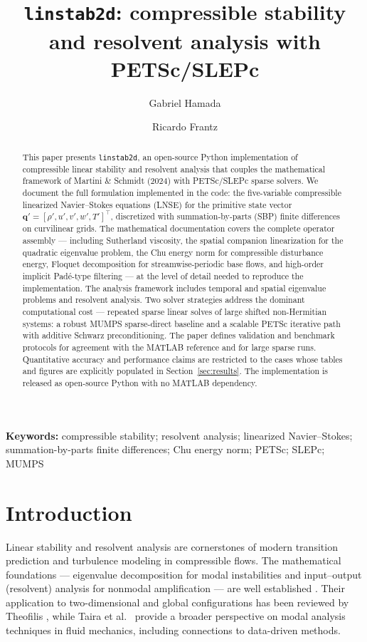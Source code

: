 \documentclass[11pt]{article}
\title{\texttt{linstab2d}: compressible stability and resolvent analysis with PETSc/SLEPc}
\author{Gabriel Hamada \and Ricardo Frantz}
\date{}
\newcommand{\bqp}{\mathbf{q}'}
\begin{document}
\maketitle

\begin{abstract}
This paper presents \texttt{linstab2d}, an open-source Python implementation of compressible linear stability and resolvent analysis that couples the mathematical framework of Martini \& Schmidt (2024) with PETSc/SLEPc sparse solvers.
We document the full formulation implemented in the code: the five-variable compressible linearized Navier--Stokes equations (LNSE) for the primitive state vector $\bqp=[\rho',u',v',w',T']^\top$, discretized with summation-by-parts (SBP) finite differences on curvilinear grids.
The mathematical documentation covers the complete operator assembly --- including Sutherland viscosity, the spatial companion linearization for the quadratic eigenvalue problem, the Chu energy norm for compressible disturbance energy, Floquet decomposition for streamwise-periodic base flows, and high-order implicit Pad\'e-type filtering --- at the level of detail needed to reproduce the implementation.
The analysis framework includes temporal and spatial eigenvalue problems and resolvent analysis.
Two solver strategies address the dominant computational cost --- repeated sparse linear solves of large shifted non-Hermitian systems: a robust MUMPS sparse-direct baseline and a scalable PETSc iterative path with additive Schwarz preconditioning.
The paper defines validation and benchmark protocols for agreement with the MATLAB reference and for large sparse runs.
Quantitative accuracy and performance claims are restricted to the cases whose tables and figures are explicitly populated in Section~\ref{sec:results}.
The implementation is released as open-source Python with no MATLAB dependency.
\end{abstract}

\noindent\textbf{Keywords:} compressible stability; resolvent analysis; linearized Navier--Stokes; summation-by-parts finite differences; Chu energy norm; PETSc; SLEPc; MUMPS

\section{Introduction}
\label{sec:intro}

Linear stability and resolvent analysis are cornerstones of modern transition prediction and turbulence modeling in compressible flows.
The mathematical foundations --- eigenvalue decomposition for modal instabilities and input--output (resolvent) analysis for nonmodal amplification --- are well established \cite{schmid2001stability,schmid2007nonmodal,trefethen1993hydrodynamic}.
Their application to two-dimensional and global configurations has been reviewed by Theofilis \cite{theofilis2011global}, while Taira et al.\ \cite{taira2017modal,taira2020modal} provide a broader perspective on modal analysis techniques in fluid mechanics, including connections to data-driven methods.
\end{document}
